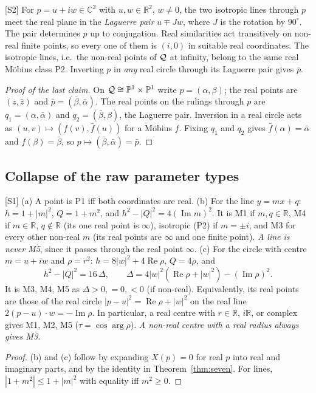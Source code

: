 \documentclass[11pt]{article}
\theoremstyle{definition}\newtheorem{definition}[theorem]{Definition}\newtheorem{remark}[theorem]{Remark}\newtheorem{example}[theorem]{Example}
\newcommand{\C}{\mathbb{C}}\newcommand{\R}{\mathbb{R}}\newcommand{\PP}{\mathbb{P}}
\newcommand{\chk}[1]{\hfill{\footnotesize\textsf{[#1]}}}
\newcommand{\cls}[1]{\textsf{#1}}
\renewcommand{\Re}{\operatorname{Re}}\renewcommand{\Im}{\operatorname{Im}}
\begin{document}
\begin{proposition}\label{prop:P2}\chk{S2}
For $p=u+iw\in\C^2$ with $u,w\in\R^2$, $w\neq0$, the two isotropic lines through $p$ meet the real plane in the \emph{Laguerre pair} $u\mp Jw$, where $J$ is the rotation by $90^\circ$. The pair determines $p$ up to conjugation. Real similarities act transitively on non-real finite points, so every one of them is $(i,0)$ in suitable real coordinates. The isotropic lines, i.e.\ the non-real points of $\mathcal{Q}$ at infinity, belong to the same real Möbius class \cls{P2}. Inverting $p$ in \emph{any} real circle through its Laguerre pair gives $\bar p$.
\end{proposition}
\begin{proof}[Proof of the last claim]
On $\Qd\cong\PP^1\times\PP^1$ write $p=(\alpha,\beta)$; the real points are $(z,\bar z)$ and $\bar p=(\bar\beta,\bar\alpha)$. The real points on the rulings through $p$ are $q_1=(\alpha,\bar\alpha)$ and $q_2=(\bar\beta,\beta)$, the Laguerre pair. Inversion in a real circle acts as $(u,v)\mapsto(f(v),\bar f(u))$ for a Möbius $f$. Fixing $q_1$ and $q_2$ gives $\bar f(\alpha)=\bar\alpha$ and $f(\beta)=\bar\beta$, so $p\mapsto(\bar\beta,\bar\alpha)=\bar p$.
\end{proof}

\subsection{Collapse of the raw parameter types}
\begin{proposition}\label{prop:raw}\chk{S1}
(a) A point is \cls{P1} iff both coordinates are real.
(b) For the line $y=mx+q$: $h=1+|m|^2$, $Q=1+m^2$, and $h^2-|Q|^2=4(\Im m)^2$. It is \cls{M1} if $m,q\in\R$, \cls{M4} if $m\in\R$, $q\notin\R$ (its one real point is $\infty$), isotropic (\cls{P2}) if $m=\pm i$, and \cls{M3} for every other non-real $m$ (its real points are $\infty$ and one finite point). \emph{A line is never \cls{M5}}, since it passes through the real point $\infty$.
(c) For the circle with centre $m=u+iw$ and $\rho=r^2$: $h=8|w|^2+4\Re\rho$, $Q=4\rho$, and
\[h^2-|Q|^2=16\,\Delta,\qquad \Delta=4|w|^2(\Re\rho+|w|^2)-(\Im\rho)^2.\]
It is \cls{M3}, \cls{M4}, \cls{M5} as $\Delta>0,=0,<0$ (if non-real). Equivalently, its real points are those of the real circle $|p-u|^2=\Re\rho+|w|^2$ on the real line $2(p-u)\cdot w=-\Im\rho$. In particular, a real centre with $r\in\R$, $i\R$, or complex gives \cls{M1}, \cls{M2}, \cls{M5} ($\tau=\cos\arg\rho$). \emph{A non-real centre with a real radius always gives \cls{M3}.}
\end{proposition}
\begin{proof}
(b) and (c) follow by expanding $X(p)=0$ for real $p$ into real and imaginary parts, and by the identity in Theorem~\ref{thm:seven}. For lines, $|1+m^2|\le1+|m|^2$ with equality iff $m^2\ge0$.
\end{proof}
\end{document}
